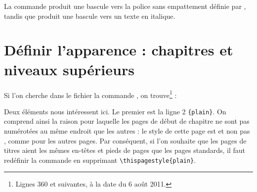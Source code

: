 \begin{latexcode}
\makeatletter
\renewcommand\section{\@startsection {section}{1}{\z@}%
                             {-3.5ex \@plus -1ex \@minus -.2ex}%
                             {2.3ex \@plus.2ex}%
                             {\sffamily\Large\it}}
\makeatother
\end{latexcode}

La commande  produit une bascule vers la police sans empattement définie par , tandis que  produit une bascule vers un texte en italique.

\section{Définir l'apparence : chapitres et niveaux supérieurs}

Si l'on cherche dans le fichier  la commande , on trouve\footnote{Lignes 360 et suivantes, à la date du 6 août 2011.} :

\begin{latexcode}
\newcommand\chapter{\if@openright\cleardoublepage\else\clearpage\fi
                    \thispagestyle{plain}%
                    \global\@topnum\z@
                    \@afterindentfalse
                    \secdef\@chapter\@schapter}
\end{latexcode}

Deux éléments nous intéressent ici. Le premier est la ligne 2 \verb|{plain}|. On comprend ainsi la raison pour laquelle les  pages de début de chapitre ne sont pas numérotées au même endroit que les autres : le style de cette page est  et non pas , comme pour les autres pages. Par conséquent, si l'on souhaite que les pages de titres aient les mêmes en-têtes et pieds de pages que les pages standards, il faut redéfinir la commande  en supprimant \verb|\thispagestyle{plain}|.\label{entetechapter}\label{chapitrepagestyle}

\begin{latexcode}
\makeatletter
\renewcommand\chapter{\if@openright\cleardoublepage %
                    \else\clearpage\fi
                    \global\@topnum\z@
                    \@afterindentfalse
                    \secdef\@chapter\@schapter}
\makeatother
\end{latexcode}

